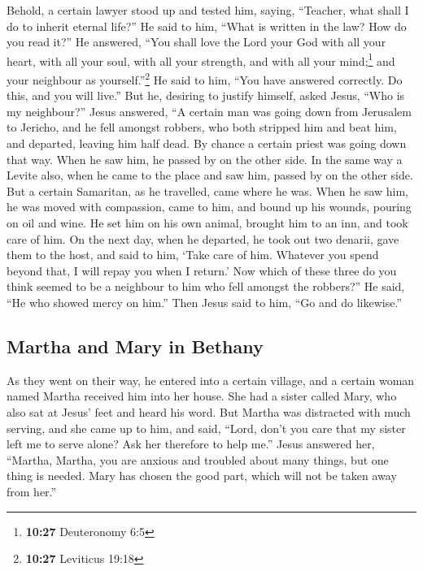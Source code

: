  Behold, a certain lawyer stood up and tested him,
saying, ``Teacher, what shall I do to inherit eternal life?''
 He said to him, ``What is written in the law? How do you
read it?''  He answered, ``You shall love the Lord your
God with all your heart, with all your soul, with all your strength, and
with all your mind;\footnote{\textbf{10:27} Deuteronomy 6:5} and your
neighbour as yourself.''\footnote{\textbf{10:27} Leviticus 19:18}
 He said to him, ``You have answered correctly. Do this,
and you will live.''  But he, desiring to justify
himself, asked Jesus, ``Who is my neighbour?''  Jesus
answered, ``A certain man was going down from Jerusalem to Jericho, and
he fell amongst robbers, who both stripped him and beat him, and
departed, leaving him half dead.  By chance a certain
priest was going down that way. When he saw him, he passed by on the
other side.  In the same way a Levite also, when he came
to the place and saw him, passed by on the other side. 
But a certain Samaritan, as he travelled, came where he was. When he saw
him, he was moved with compassion,  came to him, and
bound up his wounds, pouring on oil and wine. He set him on his own
animal, brought him to an inn, and took care of him.  On
the next day, when he departed, he took out two denarii, gave them to
the host, and said to him, `Take care of him. Whatever you spend beyond
that, I will repay you when I return.'  Now which of
these three do you think seemed to be a neighbour to him who fell
amongst the robbers?''  He said, ``He who showed mercy on
him.'' Then Jesus said to him, ``Go and do likewise.''

\hypertarget{martha-and-mary-in-bethany}{%
\subsection{Martha and Mary in
Bethany}\label{martha-and-mary-in-bethany}}

 As they went on their way, he entered into a certain
village, and a certain woman named Martha received him into her house.
 She had a sister called Mary, who also sat at Jesus'
feet and heard his word.  But Martha was distracted with
much serving, and she came up to him, and said, ``Lord, don't you care
that my sister left me to serve alone? Ask her therefore to help me.''
 Jesus answered her, ``Martha, Martha, you are anxious
and troubled about many things,  but one thing is needed.
Mary has chosen the good part, which will not be taken away from her.''

